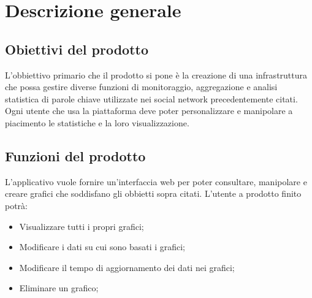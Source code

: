 %


\section{Descrizione generale}

\subsection{Obiettivi del prodotto}
L'obbiettivo primario che il prodotto si pone è la creazione di una infrastruttura che
possa gestire diverse funzioni di monitoraggio, aggregazione e analisi statistica di parole chiave utilizzate nei social network precedentemente citati. Ogni utente che usa la piattaforma deve poter personalizzare e manipolare a piacimento le statistiche e la loro visualizzazione.

\subsection{Funzioni del prodotto}
L'applicativo vuole fornire un'interfaccia web per poter consultare, manipolare e creare grafici che soddisfano gli obbietti sopra citati. L'utente a prodotto finito potrà:

\begin{itemize}
\item Visualizzare tutti i propri grafici;
\item Modificare i dati su cui sono basati i grafici;
\item Modificare il tempo di aggiornamento dei dati nei grafici;
\item Eliminare un grafico;
\end{itemize}

